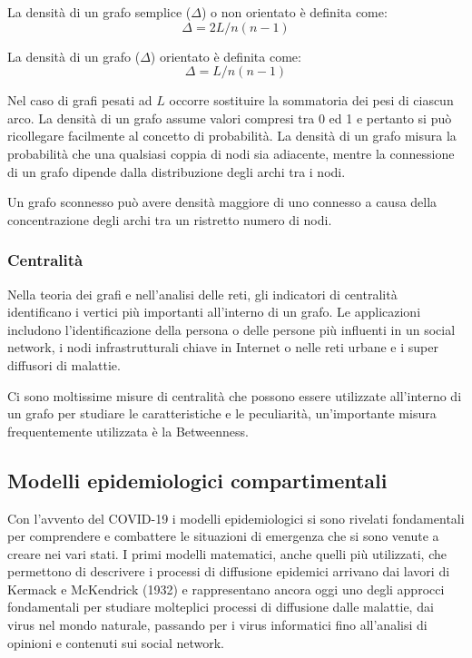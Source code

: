 La densità di un grafo semplice ($\Delta$) o non orientato è definita come:
\begin{equation}
    \Delta = 2L/n(n-1)
\end{equation}

La densità di un grafo ($\Delta$) orientato è definita come:
\begin{equation}
    \Delta = L/n(n-1)
\end{equation}

Nel caso di grafi pesati ad $L$ occorre sostituire la sommatoria dei pesi di ciascun arco.
La densità di un grafo assume valori compresi tra 0 ed 1 e pertanto si può ricollegare facilmente al concetto di probabilità. La densità di un grafo misura la probabilità che una qualsiasi coppia di nodi sia adiacente, mentre la connessione di un grafo dipende dalla distribuzione degli archi tra i nodi.

Un grafo sconnesso può avere densità maggiore di uno connesso a causa della concentrazione degli archi tra un ristretto numero di nodi.

\subsubsection{Centralità}

Nella teoria dei grafi e nell'analisi delle reti, gli indicatori di centralità \cite{GrafoCentralita} identificano i vertici più importanti all'interno di un grafo. 
Le applicazioni includono l'identificazione della persona o delle persone più influenti in un social network, i nodi infrastrutturali chiave in Internet o nelle reti urbane e i super diffusori di malattie.

Ci sono moltissime misure di centralità che possono essere utilizzate all'interno di un grafo per studiare le caratteristiche e le peculiarità, un'importante misura frequentemente utilizzata è la Betweenness. \cite{GrafoBetweenness}

\subsection{Modelli epidemiologici compartimentali}

Con l'avvento del COVID-19 i modelli epidemiologici si sono rivelati fondamentali per comprendere e combattere le situazioni di emergenza che si sono venute a creare nei vari stati.
I primi modelli matematici, anche quelli più utilizzati, che permettono di descrivere i processi di diffusione epidemici arrivano dai lavori di Kermack e McKendrick (1932) e rappresentano ancora oggi uno degli approcci fondamentali per studiare molteplici processi di diffusione dalle malattie, dai virus nel mondo naturale, passando per i virus informatici fino all'analisi di opinioni e contenuti sui social network.

